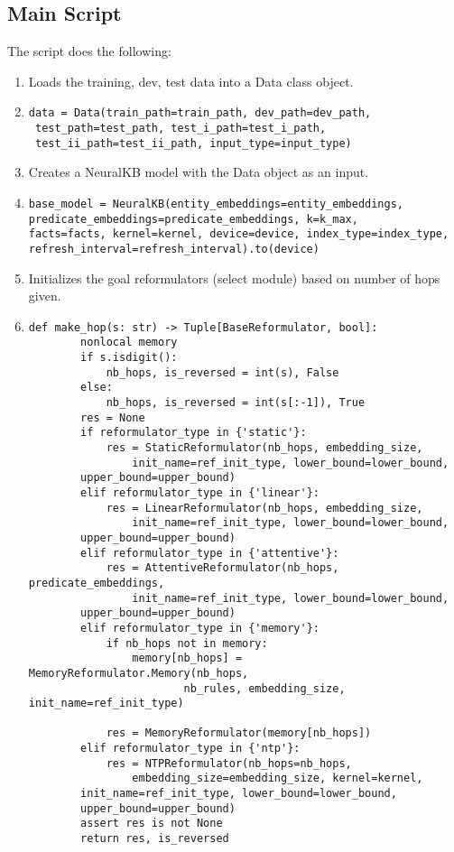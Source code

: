 \documentclass[Other]{iitddiss}
\begin{document}
\subsection{Main Script}
The script does the following:

\begin{enumerate}
\item Loads the training, dev, test data into a Data class object.
\item {\begin{lstlisting}
data = Data(train_path=train_path, dev_path=dev_path,
 test_path=test_path, test_i_path=test_i_path, 
 test_ii_path=test_ii_path, input_type=input_type)
	\end{lstlisting}}
\item Creates a NeuralKB model with the Data object as an input.
\item {\begin{lstlisting}
base_model = NeuralKB(entity_embeddings=entity_embeddings, 
predicate_embeddings=predicate_embeddings, k=k_max, 
facts=facts, kernel=kernel, device=device, index_type=index_type, 
refresh_interval=refresh_interval).to(device)	\end{lstlisting}}
\item Initializes the goal reformulators (select module) based on number of hops given.
\item {\begin{lstlisting}
def make_hop(s: str) -> Tuple[BaseReformulator, bool]:
        nonlocal memory
        if s.isdigit():
            nb_hops, is_reversed = int(s), False
        else:
            nb_hops, is_reversed = int(s[:-1]), True
        res = None
        if reformulator_type in {'static'}:
            res = StaticReformulator(nb_hops, embedding_size, 
            	init_name=ref_init_type, lower_bound=lower_bound, 
		upper_bound=upper_bound)
        elif reformulator_type in {'linear'}:
            res = LinearReformulator(nb_hops, embedding_size, 
            	init_name=ref_init_type, lower_bound=lower_bound, 
		upper_bound=upper_bound)
        elif reformulator_type in {'attentive'}:
            res = AttentiveReformulator(nb_hops, predicate_embeddings,
            	init_name=ref_init_type, lower_bound=lower_bound, 
		upper_bound=upper_bound)
        elif reformulator_type in {'memory'}:
            if nb_hops not in memory:
                memory[nb_hops] = MemoryReformulator.Memory(nb_hops, 
                		nb_rules, embedding_size, init_name=ref_init_type)

            res = MemoryReformulator(memory[nb_hops])
        elif reformulator_type in {'ntp'}:
            res = NTPReformulator(nb_hops=nb_hops, 
            	embedding_size=embedding_size, kernel=kernel, 
		init_name=ref_init_type, lower_bound=lower_bound, 
		upper_bound=upper_bound)
        assert res is not None
        return res, is_reversed
        \end{lstlisting}}


\end{enumerate}
\end{document}
